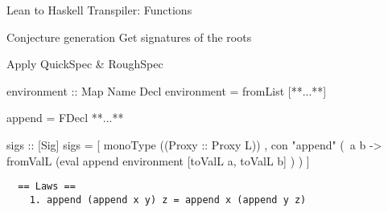 \begin{frame}{Lean to Haskell Transpiler: Functions}
  \framebreak



\end{frame}

\begin{frame}{Conjecture generation} %
  Get signatures of the roots

  Apply QuickSpec \& RoughSpec


  \pagebreak

  \begin{HaskellCode}
  environment :: Map Name Decl
  environment = fromList [**...**]

  append = FDecl {**...**}

  sigs :: [Sig]
  sigs =
    [ monoType ((Proxy :: Proxy L))
    , con "append"
        (\ a b -> fromValL
          (eval append environment
            [toValL a, toValL b]
          )
        )
    ]
  \end{HaskellCode}

  \pagebreak

  \begin{verbatim}
  == Laws ==
    1. append (append x y) z = append x (append y z)
  \end{verbatim}


\end{frame}

